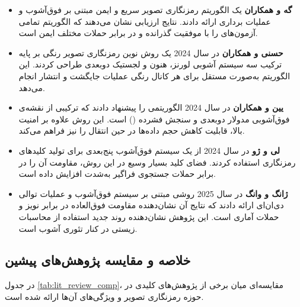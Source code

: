 \begin{itemize}
    \item \textbf{گه و همکاران\cite{ref12}} یک الگوریتم رمزنگاری تصویر سریع و ایمن مبتنی بر فوق‌آشوب و عملیات برداری ارائه دادند. نتایج ارزیابی نشان می‌دهند که الگوریتم تمامی آزمون‌های  را با موفقیت گذرانده و در برابر حملات مختلف ایمن است.
    \item \textbf{حسنی و همکاران\cite{ref13}} در سال 2024 یک روش نوین رمزنگاری تصویر رنگی بر پایه ترکیب سه سیستم آشوبی لورنز، هنون و لجستیک دوبعدی طراحی کردند. این الگوریتم به‌صورت مستقل برای هر کانال رنگی عملیات جایگشت و انتشار انجام می‌دهد.
    \item \textbf{یین و همکاران\cite{ref1}} در سال 2024 الگوریتمی را پیشنهاد دادند که ترکیبی از نقشه‌ی فوق‌آشوبی مدولار دوبعدی و سنجش فشرده () است. این روش علاوه بر امنیت بالا، قابلیت کاهش حجم داده‌ها در حین انتقال را نیز فراهم می‌کند.
    \item \textbf{لی و ژو\cite{ref52}} در سال 2024 از یک سیستم فوق‌آشوب پنج‌بعدی برای تولید کلیدهای رمزنگاری استفاده کردند. فضای کلید بسیار وسیع در این روش، مقاومت آن را در برابر حملات جستجوی فراگیر به‌شدت افزایش داده است.
    \item \textbf{ژانگ و وانگ\cite{ref51}} در سال 2025 روشی مبتنی بر سیستم فوق‌آشوب و عملیات توالی دی‌ان‌ای\protect{} ارائه دادند که نتایج آن نشان‌دهنده مقاومت فوق‌العاده در برابر نویز و حملات آماری است. این پژوهش نشان‌دهنده روند جدید استفاده از محاسبات زیستی در کنار تئوری آشوب است.
\end{itemize}

\subsection{خلاصه و مقایسه پژوهش‌های پیشین}
در جدول \ref{tab:lit_review_comp}، مقایسه‌ای میان برخی از پژوهش‌های کلیدی در حوزه رمزنگاری تصویر و ویژگی‌های آن‌ها ارائه شده است.

